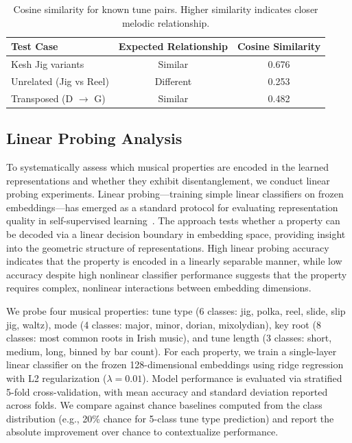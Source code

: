 \documentclass[]{interact}
\theoremstyle{plain}
\theoremstyle{definition}
\theoremstyle{remark}
\begin{document}
\begin{table}[!htb]
\centering
\caption{Cosine similarity for known tune pairs. Higher similarity indicates closer melodic relationship.}
\label{tab:variant}
\begin{tabular}{lcc}
\toprule
\textbf{Test Case} & \textbf{Expected Relationship} & \textbf{Cosine Similarity} \\
\midrule
Kesh Jig variants & Similar & 0.676 \\
Unrelated (Jig vs Reel) & Different & 0.253 \\
Transposed (D $\rightarrow$ G) & Similar & 0.482 \\
\bottomrule
\end{tabular}
\end{table}

\subsection{Linear Probing Analysis}

To systematically assess which musical properties are encoded in the learned representations and whether they exhibit disentanglement, we conduct linear probing experiments. Linear probing---training simple linear classifiers on frozen embeddings---has emerged as a standard protocol for evaluating representation quality in self-supervised learning~\cite{LinearProbing2020}. The approach tests whether a property can be decoded via a linear decision boundary in embedding space, providing insight into the geometric structure of representations. High linear probing accuracy indicates that the property is encoded in a linearly separable manner, while low accuracy despite high nonlinear classifier performance suggests that the property requires complex, nonlinear interactions between embedding dimensions.

We probe four musical properties: tune type (6 classes: jig, polka, reel, slide, slip jig, waltz), mode (4 classes: major, minor, dorian, mixolydian), key root (8 classes: most common roots in Irish music), and tune length (3 classes: short, medium, long, binned by bar count). For each property, we train a single-layer linear classifier on the frozen 128-dimensional embeddings using ridge regression with L2 regularization ($\lambda = 0.01$). Model performance is evaluated via stratified 5-fold cross-validation, with mean accuracy and standard deviation reported across folds. We compare against chance baselines computed from the class distribution (e.g., 20\% chance for 5-class tune type prediction) and report the absolute improvement over chance to contextualize performance.
\end{document}

